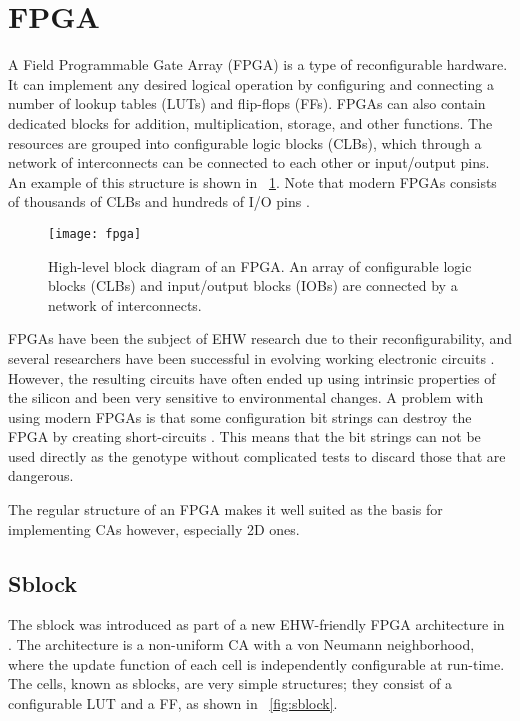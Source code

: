 
\section{FPGA}

A Field Programmable Gate Array (FPGA) is a type of reconfigurable hardware.
It can implement any desired logical operation by configuring and connecting a number of lookup tables (LUTs) and flip-flops (FFs).
FPGAs can also contain dedicated blocks for addition, multiplication, storage, and other functions.
The resources are grouped into configurable logic blocks (CLBs), which through a network of interconnects can be connected to each other or input/output pins.
An example of this structure is shown in \figurename~\ref{fig:fpga}.
Note that modern FPGAs consists of thousands of CLBs and hundreds of I/O pins \cite{ds160}.

\begin{figure}[!ht]
    \centering
    \texttt{[image: fpga]}
    \caption[FPGA]{
        High-level block diagram of an FPGA.
        An array of configurable logic blocks (CLBs) and input/output blocks (IOBs) are connected by a network of interconnects.
    }
    \label{fig:fpga}
\end{figure}

FPGAs have been the subject of EHW research due to their reconfigurability, and several researchers have been successful in evolving working electronic circuits \cite{huelsbergen1998evolution, thompson1997evolved}.
However, the resulting circuits have often ended up using intrinsic properties of the silicon and been very sensitive to environmental changes.
A problem with using modern FPGAs is that some configuration bit strings can destroy the FPGA by creating short-circuits \cite{xapp151, ug380}.
This means that the bit strings can not be used directly as the genotype without complicated tests to discard those that are dangerous.

The regular structure of an FPGA makes it well suited as the basis for implementing CAs however, especially 2D ones.

\subsection{Sblock}
\label{sec:sblock}

The sblock was introduced as part of a new EHW-friendly FPGA architecture in \cite{haddow2000sblock}.
The architecture is a non-uniform CA with a von Neumann neighborhood, where the update function of each cell is independently configurable at run-time.
The cells, known as sblocks, are very simple structures; they consist of a configurable LUT and a FF, as shown in \figurename~\ref{fig:sblock}.

